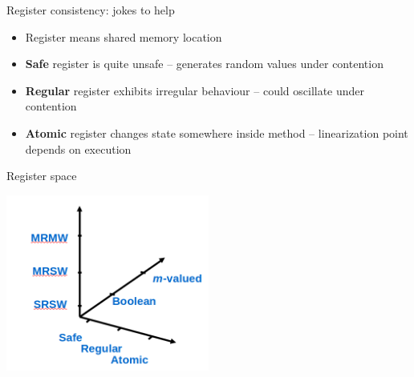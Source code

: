 \begin{frame}[fragile]{Register consistency: jokes to help}

\begin{itemize}
  \item Register means shared memory location

  \pause
  \item \textbf{Safe} register is quite unsafe -- generates random values under contention
  
  \pause
  \item \textbf{Regular} register exhibits irregular behaviour -- could oscillate under contention

  \pause
  \item \textbf{Atomic} register changes state somewhere inside method -- linearization point depends on execution
\end{itemize}
\end{frame}

\begin{frame}{Register space}

\begin{center}
  \includegraphics[width=0.5\textwidth]{./pics/space1.png}
\end{center}

\end{frame}


